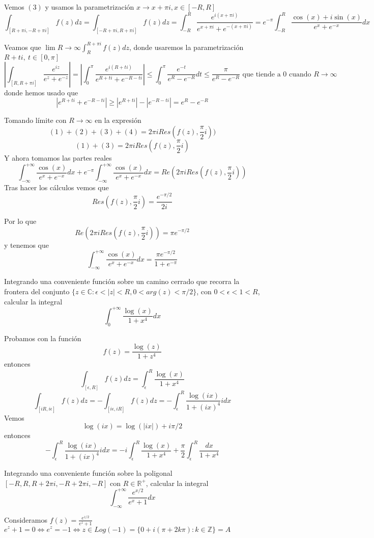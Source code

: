 Vemos $(3)$ y usamos la parametrización $x\rightarrow x+\pi i, x\in[-R,R]$
$$ \int_{[R+\pi i,-R+\pi i]} f(z)dz = \int_{[-R+\pi i,R+\pi i]} f(z)dz = \int_{-R}^{R} \frac{e^{i(x+\pi i)}}{e^{x+\pi i}+e^{-(x+\pi i)}} = e^{-\pi} \int_{-R}^{R} \frac{\cos(x)+i\sin(x)}{e^x+e^{-x}}dx $$

Veamos que $\lim{R\rightarrow\infty} \int_{R}^{R+\pi i} f(z)dz$, donde usaremos la parametrización $R+ti, \ t\in[0,\pi]$
$$ \left| \int_{[R,R+\pi i]} \frac{e^{iz}}{e^z+e^{-z}} \right|  = \left| \int_{0}^{\pi} \frac{e^{i(R+ti)}}{e^{R+ti}+e^{-R-ti}} \right| \leq \int_{0}^{\pi} \frac{e^{-t}}{e^R-e^{-R}}dt \leq \frac{\pi}{e^R-e^{-R}} \text{ que tiende a $0$ cuando $R \rightarrow\infty$}$$
donde hemos usado que
$$ | e^{R+ti}+e^{-R-ti} | \geq |e^{R+ti}|-|e^{-R-ti}| = e^R-e^{-R} $$

Tomando límite con $R\rightarrow\infty$ en la expresión
$$ (1)+(2)+(3)+(4) = 2\pi i Res(f(z),\frac{\pi}{2}i)) $$
$$ (1)+(3) = 2\pi iRes(f(z),\frac{\pi}{2}i) $$
Y ahora tomamos las partes reales
$$ \int_{-\infty}^{+\infty} \frac{\cos(x)}{e^x+e^{-x}} dx + e^{-\pi} \int_{-\infty}^{+\infty} \frac{\cos(x)}{e^x+e^{-x}}dx = Re(2\pi iRes(f(z), \frac{\pi}{2}i)) $$
Tras hacer los cálculos vemos que
$$ Res(f(z),\frac{\pi}{2}i) = \frac{e^{-\pi/2}}{2i}  $$

Por lo que 
$$ Re(2\pi iRes(f(z), \frac{\pi}{2}i)) = \pi e^{-\pi/2} $$
y tenemos que
$$ \int_{-\infty}^{+\infty} \frac{\cos(x)}{e^x+e^{-x}} dx = \frac{\pi e^{-\pi/2}}{1+e^{-\pi}} $$




\begin{ejer}
	Integrando una conveniente función sobre un camino cerrado que recorra la frontera del conjunto $\{ z\in\mathbb{C} : \epsilon < |z| < R, 0<arg(z)<\pi/2 \}$, con $0<\epsilon<1<R$, calcular la integral
	$$ \int_{0}^{+\infty} \frac{\log(x)}{1+x^4}dx $$
\end{ejer}
Probamos con la función
$$ f(z) = \frac{\log(z)}{1+z^4} $$
entonces
$$ \int_{[\epsilon, R]}f(z)dz = \int_{\epsilon}^{R} \frac{\log(x)}{1+x^4} $$
$$ \int_{[iR,i\epsilon]} f(z)dz = -\int_{[i\epsilon,iR]} f(z)dz = -\int_{\epsilon}^{R} \frac{\log(ix)}{1+(ix)^4} idx $$
Vemos
$$ \log(ix) = \log(|ix|)+i\pi/2 $$
entonces
$$ -\int_{\epsilon}^{R} \frac{\log(ix)}{1+(ix)^4} idx = -i\int_{\epsilon}^{R} \frac{\log(x)}{1+x^4} + \frac{\pi}{2} \int_{\epsilon}^{R} \frac{dx}{1+x^4} $$


\begin{ejer}
	Integrando una conveniente función sobre la poligonal $[-R,R,R+2\pi i,-R+2\pi i,-R]$ con $R\in\mathbb{R}^+$, calcular la integral
	$$ \int_{-\infty}^{+\infty} \frac{e^{x/2}}{e^x+1}dx $$
\end{ejer}
Consideramos 
$f(z) = \frac{e^{z/2}}{e^z+1}$
$e^z+1=0 \Longleftrightarrow e^z = -1 \Longleftrightarrow z\in Log(-1) = \{ 0+i(\pi+2k\pi) : k\in\mathbb{Z} \} = A$

